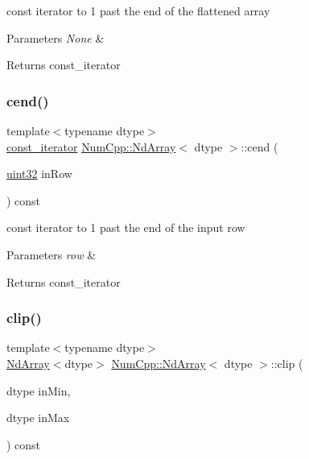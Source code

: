 const iterator to 1 past the end of the flattened array


\begin{DoxyParams}{Parameters}
{\em None} & \\
\hline
\end{DoxyParams}
\begin{DoxyReturn}{Returns}
const\+\_\+iterator 
\end{DoxyReturn}
\mbox{\label{class_num_cpp_1_1_nd_array_a709bf281113a7a04638651a48e2700ea}} 
\subsubsection{\texorpdfstring{cend()}{cend()}\hspace{0.1cm}{\footnotesize\ttfamily [2/2]}}
{\footnotesize\ttfamily template$<$typename dtype$>$ \\
\mbox{\hyperlink{class_num_cpp_1_1_nd_array_a770eaf3b67efaa19e310ed14eee5aabb}{const\+\_\+iterator}} \mbox{\hyperlink{class_num_cpp_1_1_nd_array}{Num\+Cpp\+::\+Nd\+Array}}$<$ dtype $>$\+::cend (\begin{DoxyParamCaption}\item[{\mbox{\hyperlink{namespace_num_cpp_a36f388e948380413c63011cab9b7fbd5}{uint32}}}]{in\+Row }\end{DoxyParamCaption}) const\hspace{0.3cm}{\ttfamily [inline]}}

const iterator to 1 past the end of the input row


\begin{DoxyParams}{Parameters}
{\em row} & \\
\hline
\end{DoxyParams}
\begin{DoxyReturn}{Returns}
const\+\_\+iterator 
\end{DoxyReturn}
\mbox{\label{class_num_cpp_1_1_nd_array_a880804796f0f2a03a93b95506fd37291}} 
\subsubsection{\texorpdfstring{clip()}{clip()}}
{\footnotesize\ttfamily template$<$typename dtype$>$ \\
\mbox{\hyperlink{class_num_cpp_1_1_nd_array}{Nd\+Array}}$<$dtype$>$ \mbox{\hyperlink{class_num_cpp_1_1_nd_array}{Num\+Cpp\+::\+Nd\+Array}}$<$ dtype $>$\+::clip (\begin{DoxyParamCaption}\item[{dtype}]{in\+Min,  }\item[{dtype}]{in\+Max }\end{DoxyParamCaption}) const\hspace{0.3cm}{\ttfamily [inline]}}

